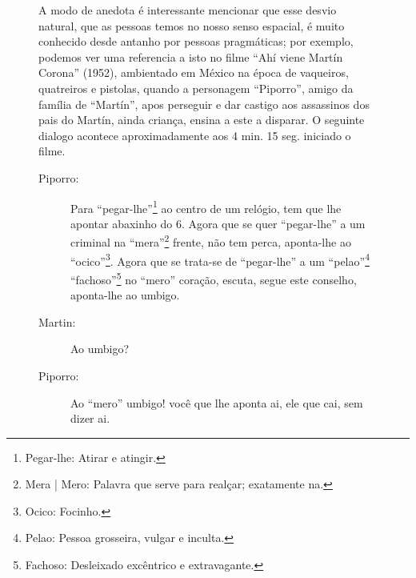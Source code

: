 \begin{figure}[!ht]
\begin{elaboracion}[title=Ah\'i viene Mart\'in Corona (1952), width= 1.00\linewidth]

A modo de anedota é interessante mencionar que esse desvio natural,
que as pessoas temos no nosso senso espacial, 
é muito conhecido desde antanho por pessoas pragmáticas;
por exemplo, podemos ver uma referencia a isto no filme ``Ahí viene Martín Corona'' (1952),
ambientado em México na época de vaqueiros, quatreiros e pistolas,
quando a personagem ``Piporro'', amigo da família de ``Martín'', 
apos perseguir e dar castigo aos assassinos dos pais do Martín, ainda criança, 
ensina a este a disparar.
O seguinte dialogo acontece aproximadamente aos 4 min. 15 seg. iniciado o filme.
\begin{description}
\item[Piporro:] 
Para ``pegar-lhe''\footnote{\label{foot:pegarle}Pegar-lhe: Atirar e atingir.} ao centro de um relógio, 
tem que lhe apontar abaxinho do 6. %
Agora que se quer ``pegar-lhe'' a um criminal na 
``mera''\footnote{\label{foot:mera}Mera | Mero: Palavra que serve para realçar; exatamente na.} frente, não tem perca,
aponta-lhe ao ``ocico''\footnote{\label{foot:ocico}Ocico: Focinho.}.
Agora que se trata-se de ``pegar-lhe'' a 
um ``pelao''\footnote{\label{foot:pelao}Pelao: Pessoa grosseira, vulgar e inculta.} 
``fachoso''\footnote{\label{foot:fachoso}Fachoso: Desleixado excêntrico e extravagante.} no ``mero'' coração,
escuta, segue este conselho, aponta-lhe ao umbigo.

\item[Martin:] Ao umbigo?

\item[Piporro:] Ao ``mero'' umbigo! você que lhe aponta ai, ele que cai, sem dizer ai.
\end{description}
\end{elaboracion}
\end{figure}
